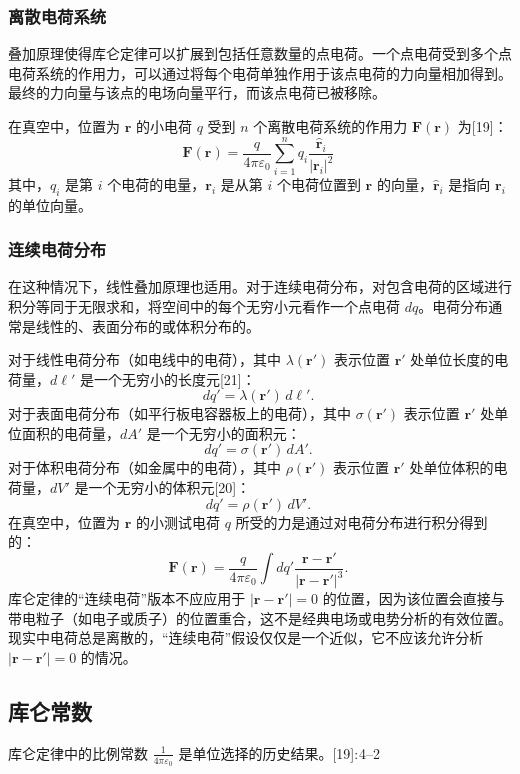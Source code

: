 \subsubsection{离散电荷系统}  
叠加原理使得库仑定律可以扩展到包括任意数量的点电荷。一个点电荷受到多个点电荷系统的作用力，可以通过将每个电荷单独作用于该点电荷的力向量相加得到。最终的力向量与该点的电场向量平行，而该点电荷已被移除。

在真空中，位置为 \(\mathbf{r}\) 的小电荷 \(q\) 受到 \(n\) 个离散电荷系统的作用力 \(\mathbf{F}(\mathbf{r})\) 为[19]：
\[
\mathbf{F}(\mathbf{r}) = \frac{q}{4\pi \varepsilon_0} \sum_{i=1}^{n} q_i \frac{\hat{\mathbf{r}}_i}{|\mathbf{r}_i|^2}~
\]
其中，\(q_i\) 是第 \(i\) 个电荷的电量，\(\mathbf{r}_i\) 是从第 \(i\) 个电荷位置到 \(\mathbf{r}\) 的向量，\(\hat{\mathbf{r}}_i\) 是指向 \(\mathbf{r}_i\) 的单位向量。
\subsubsection{连续电荷分布} 
在这种情况下，线性叠加原理也适用。对于连续电荷分布，对包含电荷的区域进行积分等同于无限求和，将空间中的每个无穷小元看作一个点电荷 \(dq\)。电荷分布通常是线性的、表面分布的或体积分布的。

对于线性电荷分布（如电线中的电荷），其中 \(\lambda(\mathbf{r'})\) 表示位置 \(\mathbf{r'}\) 处单位长度的电荷量，\(d\ell'\) 是一个无穷小的长度元[21]：
\[
dq' = \lambda (\mathbf{r'}) \, d\ell'.~
\]
对于表面电荷分布（如平行板电容器板上的电荷），其中 \(\sigma(\mathbf{r'})\) 表示位置 \(\mathbf{r'}\) 处单位面积的电荷量，\(dA'\) 是一个无穷小的面积元：
\[
dq' = \sigma (\mathbf{r'}) \, dA'.~
\]
对于体积电荷分布（如金属中的电荷），其中 \(\rho(\mathbf{r'})\) 表示位置 \(\mathbf{r'}\) 处单位体积的电荷量，\(dV'\) 是一个无穷小的体积元[20]：
\[
dq' = \rho (\mathbf{r'}) \, dV'.~
\]
在真空中，位置为 \(\mathbf{r}\) 的小测试电荷 \(q\) 所受的力是通过对电荷分布进行积分得到的：
\[
\mathbf{F}(\mathbf{r}) = \frac{q}{4 \pi \varepsilon_0} \int dq' \frac{\mathbf{r} - \mathbf{r'}}{|\mathbf{r} - \mathbf{r'}|^3}.~
\]
库仑定律的“连续电荷”版本不应应用于 \(|\mathbf{r} - \mathbf{r'}| = 0\) 的位置，因为该位置会直接与带电粒子（如电子或质子）的位置重合，这不是经典电场或电势分析的有效位置。现实中电荷总是离散的，“连续电荷”假设仅仅是一个近似，它不应该允许分析 \(|\mathbf{r} - \mathbf{r'}| = 0\) 的情况。
\subsection{库仑常数} 
库仑定律中的比例常数 \(\frac{1}{4 \pi \varepsilon_0}\) 是单位选择的历史结果。[19]: 4–2

